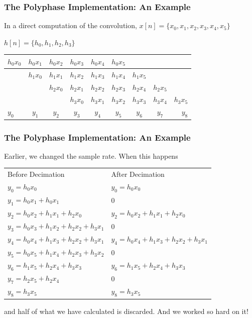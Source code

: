 \documentclass{beamer}
\begin{document}
\begin{frame}
\frametitle{The Polyphase Implementation: An Example}
In a direct computation of the convolution,
$x[n] = \{x_0, x_1, x_2, x_3, x_4, x_5\}$

$h[n] = \{h_0, h_1, h_2, h_3\}$


\begin{center}
  \begin{tabular}{ l|c|c|c|c|c|c|c|r }
    \hline
    $h_0 x_0$ & $h_0 x_1$ & $h_0 x_2$ & $h_0 x_3$ & $h_0 x_4$ & $h_0 x_5$ & & & \\ \hline
    & $h_1 x_0$ & $h_1 x_1$ & $h_1 x_2$ & $h_1 x_3$ & $h_1 x_4$ & $h_1 x_5$ & &\\ \hline
    & &$h_2 x_0$ & $h_2 x_1$ & $h_2 x_2$ & $h_2 x_3$ & $h_2 x_4$ & $h_2 x_5$ &\\ \hline
    & & &$h_3 x_0$ & $h_3 x_1$ & $h_3 x_2$ & $h_3 x_3$ & $h_3 x_4$ & $h_3 x_5$ \\\Xhline{1pt}
    $y_0$ & $y_1$ & $y_2$ & $y_3$ & $y_4$ & $y_5$ & $y_6$ & $y_7$ & $y_8$\\ \hline
  \end{tabular}
\end{center}
\end{frame}

\begin{frame}
\frametitle{The Polyphase Implementation: An Example}
Earlier, we changed the sample rate.  When this happens

\smallskip
  \begin{tabular}{ l|l }
    \hline
    Before Decimation & After Decimation\\ \Xhline{1pt}
	$y_0 = h_0 x_0$ & $y_0 = h_0 x_0$\\ \hline
	$y_1 = h_0 x_1 + h_0 x_1$ & 0\\ \hline 
	$y_2 = h_0 x_2 + h_1 x_1 + h_2 x_0$ & $y_2 = h_0 x_2 + h_1 x_1 + h_2 x_0$\\ \hline 
	$y_3 = h_0 x_3 + h_1 x_2+ h_2 x_2 + h_3 x_1$ & 0 \\ \hline 
	$y_4 = h_0 x_4 + h_1 x_3+ h_2 x_2 + h_3 x_1$ & $y_4 = h_0 x_4 + h_1 x_3+ h_2 x_2 +     	h_3 x_1$\\ \hline
	$y_5 = h_0 x_5 + h_1 x_4 + h_2 x_3 + h_3 x_2$ & 0\\ \hline
	$y_6 = h_1 x_5 + h_2 x_4 + h_3 x_3$ & $y_6 = h_1 x_5 + h_2 x_4 + h_3 x_3$\\ \hline
	$y_7 = h_2 x_5 + h_2 x_4$ & 0\\ \hline
	$y_8 = h_3 x_5$ & $y_8 = h_3 x_5$\\ \hline
  \end{tabular}
  
  \smallskip
  and half of what we have calculated is discarded.  And we worked so hard on it!
\end{frame}
\end{document}
